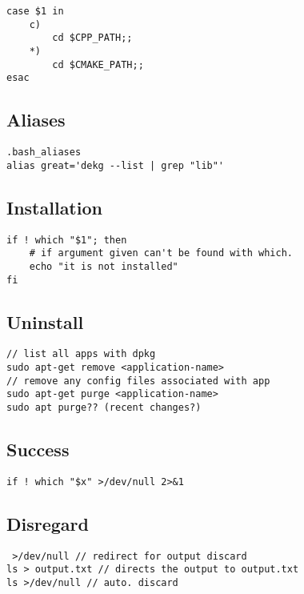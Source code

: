 \begin{verbatim}
case $1 in
    c)
        cd $CPP_PATH;;
    *)
        cd $CMAKE_PATH;;
esac
\end{verbatim}

\subsection{Aliases}

\begin{verbatim}
.bash_aliases
alias great='dekg --list | grep "lib"'
\end{verbatim}

\subsection{Installation}

\begin{verbatim}
if ! which "$1"; then
    # if argument given can't be found with which. 
    echo "it is not installed"
fi
\end{verbatim}

\subsection{Uninstall}

\begin{verbatim}
// list all apps with dpkg
sudo apt-get remove <application-name>
// remove any config files associated with app
sudo apt-get purge <application-name>
sudo apt purge?? (recent changes?) 
\end{verbatim}

\subsection{Success}

\begin{verbatim}
if ! which "$x" >/dev/null 2>&1
\end{verbatim}

\subsection{Disregard}

\begin{verbatim}
 >/dev/null // redirect for output discard
ls > output.txt // directs the output to output.txt
ls >/dev/null // auto. discard
\end{verbatim}

